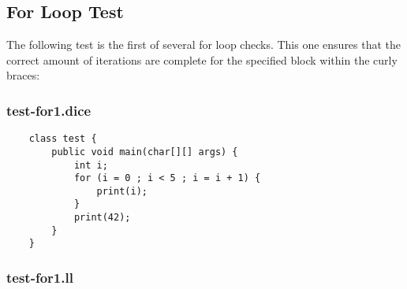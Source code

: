 \subsection{For Loop Test}
The following test is the first of several for loop checks. This one ensures that the correct amount of iterations are complete for the specified block within the curly braces:
\subsubsection{test-for1.dice}
\begin{verbatim}
	class test {
		public void main(char[][] args) {
			int i;
			for (i = 0 ; i < 5 ; i = i + 1) {
				print(i);
			}
			print(42);
		}
	}
\end{verbatim}
\subsubsection{test-for1.ll}
